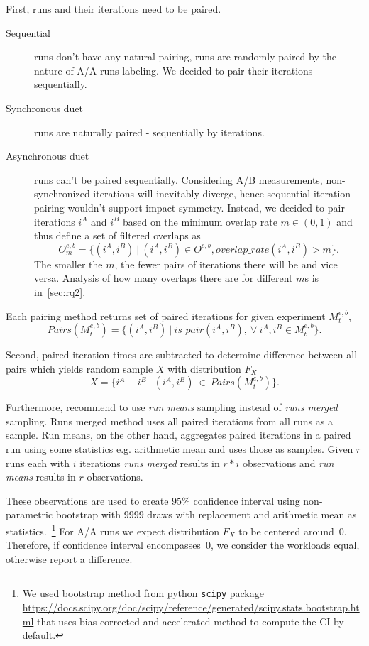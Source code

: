 First, runs and their iterations need to be paired.
\begin{description}
    \item[Sequential] runs don't have any natural pairing, runs are randomly paired by the nature of A/A runs labeling. We decided to pair their iterations sequentially.
    \item[Synchronous duet] runs are naturally paired - sequentially by iterations.
    \item[Asynchronous duet] runs can't be paired sequentially.
        Considering A/B measurements, non-synchronized iterations will inevitably diverge, hence sequential iteration pairing wouldn't support impact symmetry.
        Instead, we decided to pair iterations $i^A$ and $i^B$ based on the minimum overlap rate $m \in (0, 1)$ and thus define a set of filtered overlaps as
        $$
        O^{e,b}_m = \{(i^A, i^B)~|~(i^A, i^B) \in O^{e, b}, overlap\_rate(i^A, i^B) > m\}.
        $$
        The smaller the $m$, the fewer pairs of iterations there will be and vice versa.
        Analysis of how many overlaps there are for different $m$s is in~\cref{sec:rq2}.
\end{description}
Each pairing method returns set of paired iterations for given experiment $M^{e, b}_t$,
$$
Pairs(M^{e, b}_t) = \{(i^A, i^B)~|~is\_pair(i^A, i^B),~\forall~i^A, i^B \in M^{e, b}_t\}.
$$

Second, paired iteration times are subtracted to determine difference between all pairs which yields random sample $X$ with distribution $F_X$
$$
X = \{i^A - i^B~|~(i^A, i^B)~\in~Pairs(M^{e, b}_t)\}.
$$

Furthermore, \citet{bulej2017stat} recommend to use \emph{run means} sampling instead of \emph{runs merged} sampling.
Runs merged method uses all paired iterations from all runs as a sample.
Run means, on the other hand, aggregates paired iterations in a paired run using some statistics e.g. arithmetic mean and uses those as samples.
Given $r$ runs each with $i$ iterations \emph{runs merged} results in $r * i$ observations and \emph{run means} results in $r$ observations.

These observations are used to create $95\%$ confidence interval using non-parametric bootstrap with $9999$ draws with replacement and arithmetic mean as statistics.~\footnote{We used bootstrap method from python \lstinline{scipy} package \url{https://docs.scipy.org/doc/scipy/reference/generated/scipy.stats.bootstrap.html} that uses bias-corrected and accelerated method to compute the CI by default.}
For A/A runs we expect distribution $F_X$ to be centered around~$0$.
Therefore, if confidence interval encompasses~$0$, we consider the workloads equal, otherwise report a difference.
 
